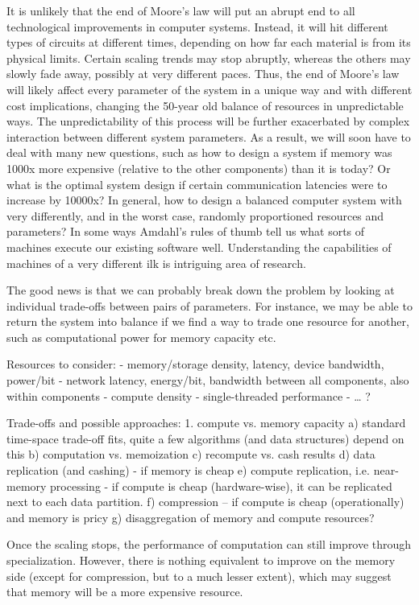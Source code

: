 It is unlikely that the end of Moore's law will put an abrupt end to all technological improvements in computer systems. Instead, it will hit different types of circuits at different times, depending on how far each material is from its physical limits. Certain scaling trends may stop abruptly, whereas the others may slowly fade away, possibly at very different paces. Thus, the end of Moore's law will likely affect every parameter of the system in a unique way and with different cost implications, changing the 50-year old balance of resources in unpredictable ways. The unpredictability of this process will be further exacerbated by complex interaction between different system parameters. As a result, we will soon have to deal with many new questions, such as how to design a system if memory was 1000x more expensive (relative to the other components) than it is today? Or what is the optimal system design if certain communication latencies were to increase by 10000x? In general, how to design a balanced computer system with very differently, and in the worst case, randomly proportioned resources and parameters? In some ways Amdahl's rules of thumb tell us what sorts of machines execute our existing software well.  Understanding the capabilities of machines of a very different ilk is intriguing area of research.

The good news is that we can probably break down the problem by looking at individual trade-offs between pairs of parameters. For instance, we may be able to return the system into balance if we find a way to trade one resource for another, such as computational power for memory capacity etc. 


Resources to consider:
- memory/storage density, latency, device bandwidth, power/bit
- network latency, energy/bit, bandwidth between all components, also within components
- compute density
- single-threaded performance
- … ?


Trade-offs and possible approaches:
1. compute vs. memory capacity
   a) standard time-space trade-off fits, quite a few algorithms (and data structures) depend on this
   b) computation vs. memoization 
   c) recompute vs. cash results
   d) data replication (and cashing) - if memory is cheap
   e) compute replication, i.e. near-memory processing - if compute is cheap (hardware-wise), it can be replicated next to each data partition.
   f) compression -- if compute is cheap (operationally) and memory is pricy
   g) disaggregation of memory and compute resources?

Once the scaling stops, the performance of computation can still improve through specialization. However, there is nothing equivalent to improve on the memory side (except for compression, but to a much lesser extent), which may suggest that memory will be a more expensive resource. 

